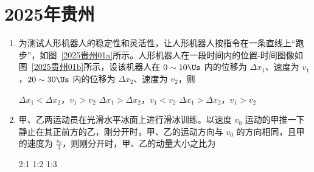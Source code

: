 \documentclass[\gkver]{gaokaozhenti}
\begin{document}
\chapter{2025年贵州}

\begin{enumerate}
\item
为测试人形机器人的稳定性和灵活性，让人形机器人按指令在一条直线上“跑步”，如图~\ref{2025贵州01a}所示。人形机器人在一段时间内的位置-时间图像如图~\ref{2025贵州01b}所示，设该机器人在 $0 \sim 10 \Us$ 内的位移为 $\Delta x_{1}$、速度为 $v_{1}$，$20 \sim 30 \Us$ 内的位移为 $\Delta x_{2}$、速度为 $v_{2}$，则


{$\Delta x_{1} < \Delta x_{2}$，$v_{1} > v_{2}$}
{$\Delta x_{1} > \Delta x_{2}$，$v_{1} < v_{2}$}
{$\Delta x_{1} > \Delta x_{2}$，$v_{1} > v_{2}$}


\item
甲、乙两运动员在光滑水平冰面上进行滑冰训练。以速度 $v_{0}$ 运动的甲推一下静止在其正前方的乙，刚分开时，甲、乙的运动方向与 $v_{0}$ 的方向相同，且甲的速度为 $\frac{v_{0}}{3}$，则刚分开时，甲、乙的动量大小之比为

{2:1}
{1:2}
{1:3}

\end{enumerate}
\end{document}
